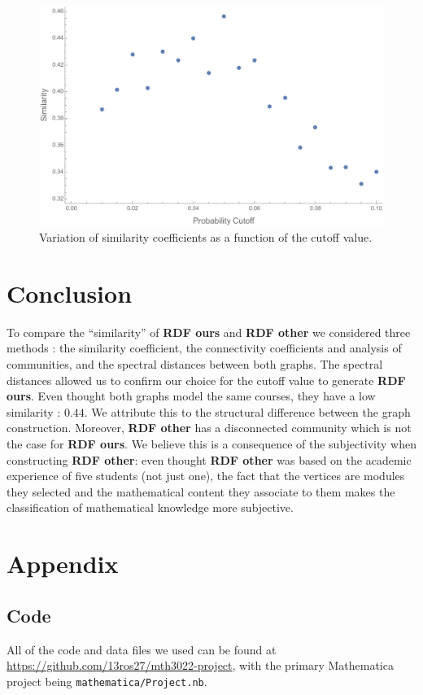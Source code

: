 \documentclass[english, 12pt]{article}
\begin{document}
\begin{figure}
\centering
\includegraphics[scale=.4]{Similarity.pdf}
\caption{Variation of similarity coefficients as a function of the cutoff value.}
\label{fig:similarity}
\end{figure}

\section{Conclusion}
To compare the ``similarity'' of {\bf RDF ours} and {\bf RDF other} we considered three methods : the similarity coefficient, the connectivity coefficients and analysis of communities, and the spectral distances between both graphs. 
The spectral distances allowed us to confirm our choice for the cutoff value to generate {\bf RDF ours}.
Even thought both graphs model the same courses, they have a low similarity : $0.44$. We attribute this to the structural difference between the graph construction. Moreover, {\bf RDF other} has a disconnected community which is not the case for {\bf RDF ours}. We believe this is a consequence of the subjectivity when constructing {\bf RDF other}: even thought {\bf RDF other} was based on the academic experience of five students (not just one), the fact that the vertices are modules they selected and the mathematical content they associate to them makes the classification of mathematical knowledge more subjective.

\printbibliography
\appendix
\section{Appendix}
\parskip=0.0pt
\subsection{Code}
All of the code and data files we used can be found at \url{https://github.com/13ros27/mth3022-project}, with the primary Mathematica project being \texttt{mathematica/Project.nb}.
\end{document}
